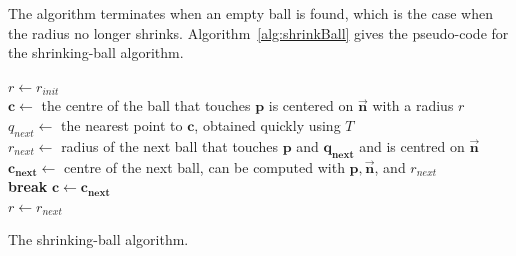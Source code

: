 The algorithm terminates when an empty ball is found, which is the case when the radius no longer shrinks.
Algorithm~\ref{alg:shrinkBall} gives the pseudo-code for the shrinking-ball algorithm.
\begin{algorithm}[tb]
	\DontPrintSemicolon{}
	$r \leftarrow r_{init}$ \\
	$\mathbf{c} \leftarrow$ the centre of the ball that touches $\mathbf{p}$ is centered on $\vec{\mathbf{n}}$ with a radius $r$ \\
	 {
		$q_{next} \leftarrow$ the nearest point to $\mathbf{c}$, obtained quickly using $T$ \\
		$r_{next} \leftarrow$ radius of the next ball that touches $\mathbf{p}$ and $\mathbf{q_{next}}$ and is centred on $\vec{\mathbf{n}}$ \\
		$\mathbf{c_{next}} \leftarrow$ centre of the next ball, can be computed with $\mathbf{p}, \vec{\mathbf{n}}$, and $r_{next}$ \\
		 {
			\textbf{break}
		}
		$\mathbf{c} \leftarrow \mathbf{c_{next}}$ \\
		$r \leftarrow r_{next}$
	}
	\caption{The shrinking-ball algorithm.}
	\label{alg:shrinkBall}
\end{algorithm}

